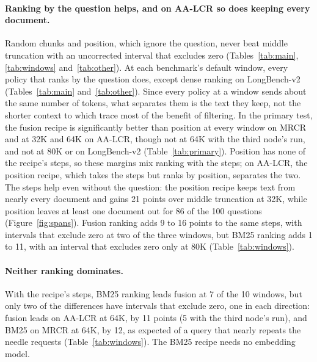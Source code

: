 \documentclass[letterpaper]{article} %
\newcommand{\recipe}{fusion recipe}
\begin{document}
\paragraph{Ranking by the question helps, and on AA-LCR so does keeping every document.} Random chunks and position, which ignore the question, never beat middle truncation with an uncorrected interval that excludes zero (Tables~\ref{tab:main}, \ref{tab:windows} and~\ref{tab:other}). At each benchmark's default window, every policy that ranks by the question does, except dense ranking on LongBench-v2 (Tables~\ref{tab:main} and~\ref{tab:other}). Since every policy at a window sends about the same number of tokens, what separates them is the text they keep, not the shorter context to which \citet{gao2026ink} trace most of the benefit of filtering. In the primary test, the \recipe{} is significantly better than position at every window on MRCR and at 32K and 64K on AA-LCR, though not at 64K with the third node's run, and not at 80K or on LongBench-v2 (Table~\ref{tab:primary}). Position has none of the recipe's steps, so these margins mix ranking with the steps; on AA-LCR, the position recipe, which takes the steps but ranks by position, separates the two. The steps help even without the question: the position recipe keeps text from nearly every document and gains 21 points over middle truncation at 32K, while position leaves at least one document out for 86 of the 100 questions (Figure~\ref{fig:spans}). Fusion ranking adds 9 to 16 points to the same steps, with intervals that exclude zero at two of the three windows, but BM25 ranking adds 1 to 11, with an interval that excludes zero only at 80K (Table~\ref{tab:windows}).

\paragraph{Neither ranking dominates.} With the recipe's steps, BM25 ranking leads fusion at 7 of the 10 windows, but only two of the differences have intervals that exclude zero, one in each direction: fusion leads on AA-LCR at 64K, by 11 points (5 with the third node's run), and BM25 on MRCR at 64K, by 12, as expected of a query that nearly repeats the needle requests (Table~\ref{tab:windows}). The BM25 recipe needs no embedding model.
\end{document}

